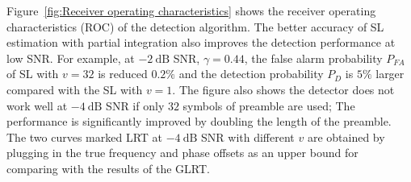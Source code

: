 

Figure~\ref{fig:Receiver operating characteristics} shows the receiver
operating characteristics (ROC) of the detection algorithm. 
The better accuracy of SL estimation with partial integration also
improves the detection performance  at low SNR.
For example, at $\SI{-2}{\dB}$ SNR, $\gamma=0.44$, the false alarm probability $P_{FA}$ of SL with $v=32$ is reduced $0.2\%$ and 
the detection probability $P_{D}$ is $5\%$ larger compared with the SL with $v{=}1$. 
The figure also shows the detector does not work well at $\SI{-4}{\dB}$ SNR if only $32$ symbols of preamble are used;  
The performance is significantly improved by doubling the length of
the preamble. The two curves marked LRT at $\SI{-4}{\dB}$ SNR with different $v$
are obtained by plugging in the true frequency and phase offsets as an upper bound for comparing with 
the results of the GLRT.   


